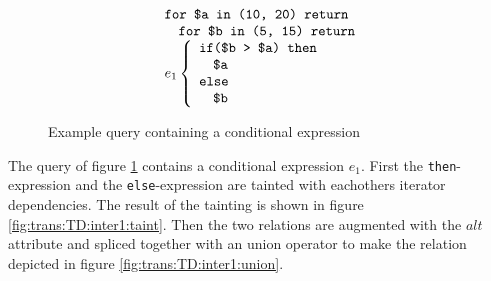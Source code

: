 \begin{myExample}
\begin{figure}[h]
\centering
\begin{equation*}
\begin{array}{l}
\mbox{\texttt{for \$a in (10, 20) return}} \\ \quad
\mbox{\texttt{for \$b in (5, 15) return}} \\ 
e_1 \left\{\begin{array}{l}
           \mbox{\texttt{if(\$b > \$a) then}} \\ \quad
           \mbox{\texttt{\$a}} \\ 
           \mbox{\texttt{else}} \\ \quad
           \mbox{\texttt{\$b}}
           \end{array}\right.
\end{array}
\end{equation*}
\caption{Example query containing a conditional expression \label{fig:trans:TD:condQue}}
\end{figure}

The query of figure \ref{fig:trans:TD:condQue} contains a conditional expression $e_1$. First the
\texttt{then}-expression and the \texttt{else}-expression are tainted with eachothers iterator dependencies. The
result of the tainting is shown in figure \ref{fig:trans:TD:inter1:taint}. Then the two relations are augmented
with the $alt$ attribute and spliced together with an \textsf{union} operator to make the relation depicted in
figure \ref{fig:trans:TD:inter1:union}.


\end{myExample}
